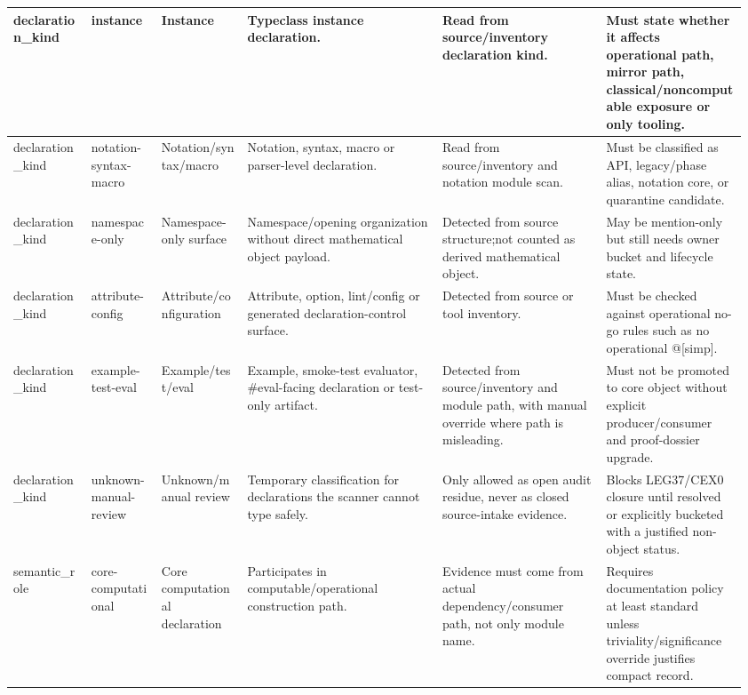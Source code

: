 \begin{longtable}{L{0.105\linewidth} L{0.095\linewidth} L{0.11\linewidth} L{0.255\linewidth} L{0.215\linewidth} L{0.185\linewidth}}
\hline
\addlinespace[0.24em]
declaration\_kind & instance & Instance & Typeclass instance declaration. & Read from source/\allowbreak{}inventory declaration kind. & Must state whether it affects operational path, mirror path, classical/\allowbreak{}noncomputable exposure or only tooling.\\
\hline
\addlinespace[0.24em]
declaration\_kind & notation-syntax-macro & Notation/\allowbreak{}syntax/\allowbreak{}macro & Notation, syntax, macro or parser-level declaration. & Read from source/\allowbreak{}inventory and notation module scan. & Must be classified as API, legacy/\allowbreak{}phase alias, notation core, or quarantine candidate.\\
\hline
\addlinespace[0.24em]
declaration\_kind & namespace-only & Namespace-only surface & Namespace/\allowbreak{}opening organization without direct mathematical object payload. & Detected from source structure;\newline not counted as derived mathematical object. & May be mention-only but still needs owner bucket and lifecycle state.\\
\hline
\addlinespace[0.24em]
declaration\_kind & attribute-config & Attribute/\allowbreak{}configuration & Attribute, option, lint/\allowbreak{}config or generated declaration-control surface. & Detected from source or tool inventory. & Must be checked against operational no-go rules such as no operational @[simp].\\
\hline
\addlinespace[0.24em]
declaration\_kind & example-test-eval & Example/\allowbreak{}test/\allowbreak{}eval & Example, smoke-test evaluator, \#eval-facing declaration or test-only artifact. & Detected from source/\allowbreak{}inventory and module path, with manual override where path is misleading. & Must not be promoted to core object without explicit producer/\allowbreak{}consumer and proof-dossier upgrade.\\
\hline
\addlinespace[0.24em]
declaration\_kind & unknown-manual-review & Unknown/\allowbreak{}manual review & Temporary classification for declarations the scanner cannot type safely. & Only allowed as open audit residue, never as closed source-intake evidence. & Blocks LEG37/\allowbreak{}CEX0 closure until resolved or explicitly bucketed with a justified non-object status.\\
\hline
\addlinespace[0.24em]
semantic\_role & core-computational & Core computational declaration & Participates in computable/\allowbreak{}operational construction path. & Evidence must come from actual dependency/\allowbreak{}consumer path, not only module name. & Requires documentation policy at least standard unless triviality/\allowbreak{}significance override justifies compact record.\\

\end{longtable}
